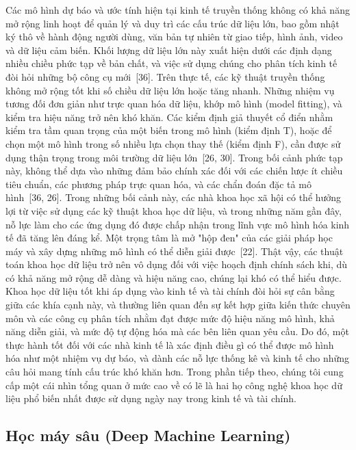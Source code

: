 Các mô hình dự báo và ước tính hiện tại kinh tế truyền thống không có khả năng mở rộng linh hoạt để quản lý và duy trì các cấu trúc dữ liệu lớn, bao gồm nhật ký thô về hành động người dùng, văn bản tự nhiên từ giao tiếp, hình ảnh, video và dữ liệu cảm biến. Khối lượng dữ liệu lớn này xuất hiện dưới các định dạng nhiều chiều phức tạp về bản chất, và việc sử dụng chúng cho phân tích kinh tế đòi hỏi những bộ công cụ mới~[36]. Trên thực tế, các kỹ thuật truyền thống không mở rộng tốt khi số chiều dữ liệu lớn hoặc tăng nhanh. Những nhiệm vụ tương đối đơn giản như trực quan hóa dữ liệu, khớp mô hình (model fitting), và kiểm tra hiệu năng trở nên khó khăn. Các kiểm định giả thuyết cổ điển nhằm kiểm tra tầm quan trọng của một biến trong mô hình (kiểm định T), hoặc để chọn một mô hình trong số nhiều lựa chọn thay thế (kiểm định F), cần được sử dụng thận trọng trong môi trường dữ liệu lớn~[26, 30]. Trong bối cảnh phức tạp này, không thể dựa vào những đảm bảo chính xác đối với các chiến lược ít chiều tiêu chuẩn, các phương pháp trực quan hóa, và các chẩn đoán đặc tả mô hình~[36, 26]. Trong những bối cảnh này, các nhà khoa học xã hội có thể hưởng lợi từ việc sử dụng các kỹ thuật khoa học dữ liệu, và trong những năm gần đây, nỗ lực làm cho các ứng dụng đó được chấp nhận trong lĩnh vực mô hình hóa kinh tế đã tăng lên đáng kể. Một trọng tâm là mở "hộp đen" của các giải pháp học máy và xây dựng những mô hình có thể diễn giải được~[22]. Thật vậy, các thuật toán khoa học dữ liệu trở nên vô dụng đối với việc hoạch định chính sách khi, dù có khả năng mở rộng dễ dàng và hiệu năng cao, chúng lại khó có thể hiểu được. Khoa học dữ liệu tốt khi áp dụng vào kinh tế và tài chính đòi hỏi sự cân bằng giữa các khía cạnh này, và thường liên quan đến sự kết hợp giữa kiến thức chuyên môn và các công cụ phân tích nhằm đạt được mức độ hiệu năng mô hình, khả năng diễn giải, và mức độ tự động hóa mà các bên liên quan yêu cầu. Do đó, một thực hành tốt đối với các nhà kinh tế là xác định điều gì có thể được mô hình hóa như một nhiệm vụ dự báo, và dành các nỗ lực thống kê và kinh tế cho những câu hỏi mang tính cấu trúc khó khăn hơn. Trong phần tiếp theo, chúng tôi cung cấp một cái nhìn tổng quan ở mức cao về có lẽ là hai họ công nghệ khoa học dữ liệu phổ biến nhất được sử dụng ngày nay trong kinh tế và tài chính.

\subsection{Học máy sâu (Deep Machine Learning)}

